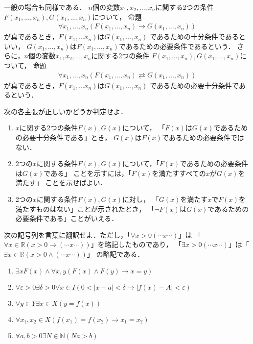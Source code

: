  一般の場合も同様である．
 $n$個の変数$x_1, x_2, \ldots , x_n$に関する2つの条件
 $F(x_1, \ldots , x_n), G(x_1, \ldots , x_n)$について，
 命題
 \begin{align}
   \forall x_1, \ldots , x_n ( F(x_1, \ldots , x_n ) \to G(x_1, \ldots , x_n))
   \label{eq:nFGnaraba}
 \end{align}
 が真であるとき，$F(x_1, \ldots x_n)$は$G(x_1, \ldots , x_n)$
 であるための十分条件であるといい，
 $G(x_1, \ldots , x_n)$は$F(x_1, \ldots , x_n)$であるための必要条件であるという．
 さらに，$n$個の変数$x_1, x_2, \ldots , x_n$に関する2つの条件
 $F(x_1, \ldots , x_n), G(x_1, \ldots , x_n)$について，
 命題
 \begin{align}
   \forall x_1, \ldots , x_n ( F(x_1, \ldots , x_n ) \rightleftarrows G(x_1, \ldots , x_n))
   \label{eq:nFGnarabadouti}
 \end{align}
 が真であるとき，$F(x_1, \ldots x_n)$は$G(x_1, \ldots , x_n)$
 であるための必要十分条件であるという．


 \begin{que} \label{chp:sequent.sec:hituyoujubun.que:xhituyoujubun}
   次の各主張が正しいかどうか判定せよ．
   \begin{enumerate}
     \item $x$に関する2つの条件$F(x), G(x)$について，
       「$F(x)$は$G(x)$であるための必要十分条件である」とき，
       $G(x)$は$F(x)$であるための必要条件ではない． %
     \item 2つの$x$に関する条件$F(x),G(x)$について，「$F(x)$であるための必要条件は$G(x)$である」
       ことを示すには，「$F(x)$を満たすすべての$x$が$G(x)$を満たす」
       ことを示せばよい． %
     \item 2つの$x$に関する条件$F(x),G(x)$に対し，
       「$G(x)$を満たす$x$で$F(x)$を満たすものはない」ことが示されたとき，
       「$\lnot F(x)$は$G(x)$であるための必要条件である」ことがいえる．%
   \end{enumerate}
 \end{que}

 \begin{que} \label{que:kigoukaranihongo}
   次の記号列を言葉に翻訳せよ．ただし，「$\forall x >0(\cdots x \cdots )$」は
   「$\forall x \in \mathbb{R}( x>0 \to (\cdots x \cdots ))$」を略記したものであり，
   「$\exists x>0 (\cdots x \cdots )$」は「$\exists x \in \mathbb{R}
   ( x>0 \land ( \cdots x \cdots ))$」
   の略記である．
   \begin{enumerate}
     \item $\exists x F(x) \land \forall x,y (F(x) \land F(y) \to x=y)$
     \item $\forall \varepsilon >0 \exists \delta >0 \forall x \in I
       ( 0< \lvert x- a \rvert < \delta \to \lvert f(x) - A \rvert < \varepsilon)$
     \item $\forall y \in Y \exists x \in X (y=f(x))$
     \item $\forall x_1, x_2 \in X (f(x_1) = f(x_2) \to x_1 = x_2)$
     \item $\forall a,b >0 \exists N \in \mathbb{N} ( Na > b)$
   \end{enumerate}
 \end{que}


